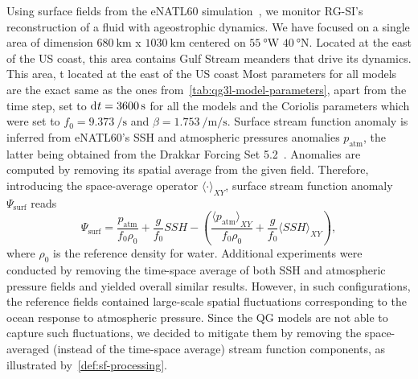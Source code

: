 \documentclass[
  draft
]{agujournal2025}
\begin{document}
Using surface fields from the eNATL60 simulation~\cite{brodeau2020}, we monitor RG-SI's reconstruction of a fluid with ageostrophic dynamics. We have focused on a single area of dimension $\qty{680}{\kilo\meter}$ x $\qty{1030}{\kilo\meter}$ centered on $\qty{55}{\degree}$W $\qty{40}{\degree}$N. Located at the east of the US coast, this area contains Gulf Stream meanders that drive its dynamics.
This area, t located at the east of the US coast
Most parameters for all models are the exact same as the ones from~\cref{tab:qg3l-model-parameters}, apart from the time step, set to $\dt = \qty{3600}{\second}$ for all the models and the Coriolis parameters which were set to $f_0 = \qty{9.373}{\per\second}$ and $\beta = \qty{1.753}{\per\meter\per\second}$. Surface stream function anomaly is inferred from eNATL60's SSH and atmospheric pressures anomalies $p_{\mathrm{atm}}$, the latter being obtained from the Drakkar Forcing Set 5.2~\cite{dussin2016}. Anomalies are computed by removing its spatial average from the given field. Therefore, introducing the space-average operator ${\langle \cdot \rangle}_{XY}$, surface stream function anomaly $\Psi_{\mathrm{surf}}$ reads 
\begin{equation}\label{def:sf-processing}
    \Psi_{\mathrm{surf}} = \frac{p_{\mathrm{atm}}}{f_0 \rho_0} + \frac{g}{f_0} SSH - \left(\frac{{\langle p_{\mathrm{atm}} \rangle}_{XY}}{f_0 \rho_0} + \frac{g}{f_0}{\langle SSH \rangle}_{XY}\right),
\end{equation}
where $\rho_0$ is the reference density for water. Additional experiments were conducted by removing the time-space average of both SSH and atmospheric pressure fields and yielded overall similar results. However, in such configurations, the reference fields contained large-scale spatial fluctuations corresponding to the ocean response to atmospheric pressure. Since the QG models are not able to capture such fluctuations, we decided to mitigate them by removing the space-averaged (instead of the time-space average) stream function components, as illustrated by~\cref{def:sf-processing}.
\end{document}
